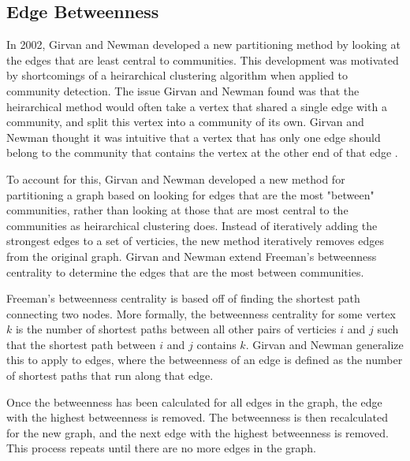 \documentclass{article}
\begin{document}
    \subsection{Edge Betweenness}
    In 2002, Girvan and Newman developed a new partitioning method by looking at the edges that are least central to communities. This development was motivated by shortcomings of a heirarchical clustering algorithm when applied to community detection. The issue Girvan and Newman found was that the heirarchical method would often take a vertex that shared a single edge with a community, and split this vertex into a community of its own. Girvan and Newman thought it was intuitive that a vertex that has only one edge should belong to the community that contains the vertex at the other end of that edge \cite{Girvan7821}.
    \par
    To account for this, Girvan and Newman developed a new method for partitioning a graph based on looking for edges that are the most "between" communities, rather than looking at those that are most central to the communities as heirarchical clustering does. Instead of iteratively adding the strongest edges to a set of verticies, the new method iteratively removes edges from the original graph. Girvan and Newman extend Freeman's betweenness centrality to determine the edges that are the most between communities.
    \par
    Freeman's betweenness centrality is based off of finding the shortest path connecting two nodes. More formally, the betweenness centrality for some vertex $k$ is the number of shortest paths between all other pairs of verticies $i$ and $j$ such that the shortest path between $i$ and $j$ contains $k$. Girvan and Newman generalize this to apply to edges, where the betweenness of an edge is defined as the number of shortest paths that run along that edge.
    \par
    Once the betweenness has been calculated for all edges in the graph, the edge with the highest betweenness is removed. The betweenness is then recalculated for the new graph, and the next edge with the highest betweenness is removed. This process repeats until there are no more edges in the graph.
\end{document}
